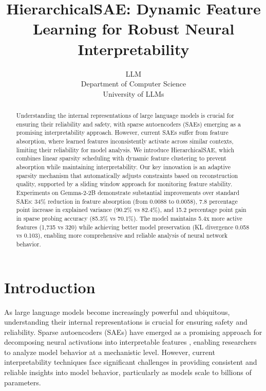 \documentclass{article} %
\title{HierarchicalSAE: Dynamic Feature Learning for Robust Neural Interpretability}
\author{LLM\\
Department of Computer Science\\
University of LLMs\\
}
\begin{document}
\maketitle

\begin{abstract}
Understanding the internal representations of large language models is crucial for ensuring their reliability and safety, with sparse autoencoders (SAEs) emerging as a promising interpretability approach. However, current SAEs suffer from feature absorption, where learned features inconsistently activate across similar contexts, limiting their reliability for model analysis. We introduce HierarchicalSAE, which combines linear sparsity scheduling with dynamic feature clustering to prevent absorption while maintaining interpretability. Our key innovation is an adaptive sparsity mechanism that automatically adjusts constraints based on reconstruction quality, supported by a sliding window approach for monitoring feature stability. Experiments on Gemma-2-2B demonstrate substantial improvements over standard SAEs: 34\% reduction in feature absorption (from 0.0088 to 0.0058), 7.8 percentage point increase in explained variance (90.2\% vs 82.4\%), and 15.2 percentage point gain in sparse probing accuracy (85.3\% vs 70.1\%). The model maintains 5.4x more active features (1,735 vs 320) while achieving better model preservation (KL divergence 0.058 vs 0.103), enabling more comprehensive and reliable analysis of neural network behavior.
\end{abstract}

\section{Introduction}
\label{sec:intro}

As large language models become increasingly powerful and ubiquitous, understanding their internal representations is crucial for ensuring safety and reliability. Sparse autoencoders (SAEs) have emerged as a promising approach for decomposing neural activations into interpretable features \cite{gaoScalingEvaluatingSparse}, enabling researchers to analyze model behavior at a mechanistic level. However, current interpretability techniques face significant challenges in providing consistent and reliable insights into model behavior, particularly as models scale to billions of parameters.
\end{document}
